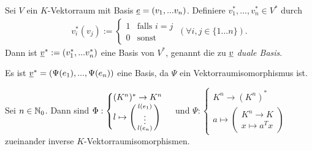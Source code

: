 \documentclass[../../main.tex]{subfiles}
\begin{document}
\begin{kordef}\label{13.1.5}
Sei $V$ ein $K$-Vektorraum mit Basis ${\underline e}=(v_1,...v_n)$. Definiere $v_1^*,...,v_n^*\in V^*$ durch
\begin{align*}
v_i^*(v_j):=\begin{cases} 1 & \text{falls } i=j\\ 0 & \text{sonst}\end{cases}\ (\forall i,j\in \{1...n\}).
\end{align*}
Dann ist ${\underline v}^*:=(v_1^*,...v_n^*)$ eine Basis von $V^*$, genannt die zu ${\underline v}$ \emph{duale Basis}.
\end{kordef}	
\begin{cproof}
Es ist ${\underline v}^*=(\Psi(e_1),...,\Psi(e_n))$ eine Basis, da $\Psi$ ein Vektorraumisomorphismus ist.
\end{cproof}

\begin{kor}\label{13.1.6}
Sei $n\in \mathbb N_0$. Dann sind $\Phi: \begin{cases}(K^n)^*\to K^n\\l\mapsto \left(\begin{smallmatrix}l(e_1)\\\vdots\\l(e_n)\end{smallmatrix}\right)\end{cases}$ und $\Psi: \begin{cases}K^n\to (K^n)^*\\ a\mapsto\begin{pmatrix*}K^n\to K\\ x\mapsto a^Tx\end{pmatrix*}\end{cases}$ zueinander inverse $K$-Vektorraumisomorphismen.
\end{kor}
	
\end{document}
